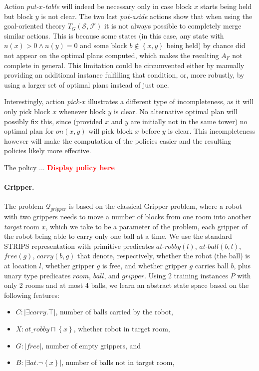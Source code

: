 \documentclass[letterpaper]{article} %
\newcommand{\set}[1]{\ensuremath{\left\{#1 \right\}}}
\newcommand{\abs}[1]{\ensuremath{\left\vert{#1}\right\vert}}
\newcommand{\alert}[1]{\textcolor{red}{\bf #1}}
\newcommand{\Q}{\mathcal{Q}}
\newcommand{\F}{\mathcal{F}}
\renewcommand{\S}{\mathcal{S}}
\begin{document}
Action \emph{put-$x$-table} will indeed be necessary only in case block $x$ starts being held
but block $y$ is not clear.
%
The two last \emph{put-aside} actions show that when using the goal-oriented theory $T_G(\S,\F)$
it is not always possible to completely merge similar actions.
This is because some states (in this case, any state with $n(x) > 0 \land n(y) = 0$ and some block $b \not\in \set{x,y}$ being held)
by chance did not appear on the optimal plans computed, which makes the resulting $A_F$ not complete in general.
This limitation could be circumvented either by manually providing an additional 
instance fulfilling that condition, or, more robustly, by using a larger set of optimal plans instead of just one.

Interestingly, action \emph{pick-$x$} illustrates a different type of incompleteness, as it will
only pick block $x$ whenever block $y$ is clear. No alternative optimal plan will possibly fix this,
since (provided $x$ and $y$ are initially not in the same tower) no optimal plan for $on(x,y)$ will pick block $x$ before $y$ is clear.
This incompleteness however will make the computation of the policies easier and the resulting policies likely more effective.


The policy ...
\alert{Display policy here}


\paragraph{Gripper.}
The problem $\Q_{gripper}$ is based on the classical Gripper problem, where a robot with two grippers needs to 
move a number of blocks from one room into another \emph{target} room $x$, which we take to be a parameter of the problem,
each gripper of the robot being able to carry only one ball at a time.
We use the standard STRIPS representation with primitive predicates $at\text{-}robby(l)$, $at\text{-}ball(b, l)$, $free(g)$, $carry(b, g)$ that denote,
respectively, whether the robot (the ball) is at location $l$, whether gripper $g$ is free, and whether gripper $g$ carries ball $b$,
plus unary type predicates $room$, $ball$, and $gripper$.
%
Using 2 training instances $P$ with only 2 rooms and at most 4 balls, we learn an abstract state space
based on the following features:

\begin{itemize}
\item $C: \abs{\exists carry . \top}$, number of balls carried by the robot, 
\item $X: at\_robby \sqcap \set{x}$, whether robot in target room,
\item $G: \abs{free}$, number of empty grippers, and
\item $B: \abs{\exists at . \neg \set{x}}$, number of balls not in target room,
\end{itemize}
\end{document}
